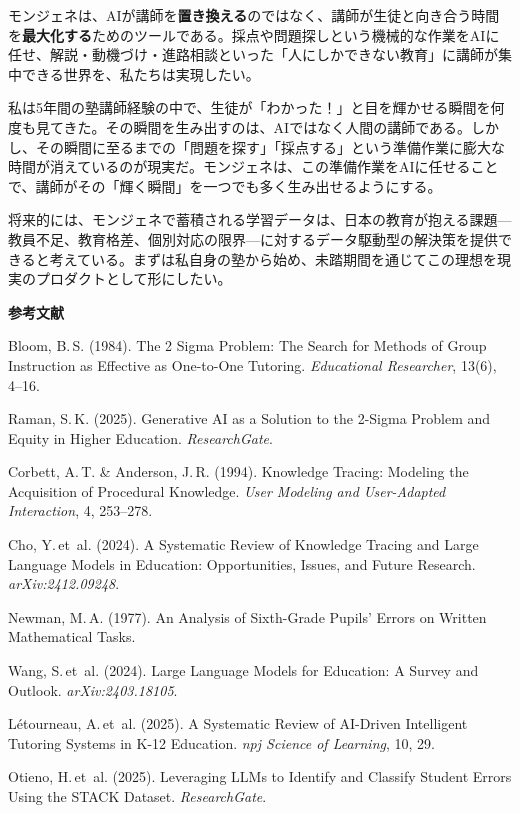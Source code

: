 \documentclass[paper=a4,fontsize=10.5bp,jafontsize=10.5bp,twocolumn]{jlreq}
\begin{document}
モンジェネは、AIが講師を\textbf{置き換える}のではなく、講師が生徒と向き合う時間を\textbf{最大化する}ためのツールである。採点や問題探しという機械的な作業をAIに任せ、解説・動機づけ・進路相談といった「人にしかできない教育」に講師が集中できる世界を、私たちは実現したい。

私は5年間の塾講師経験の中で、生徒が「わかった！」と目を輝かせる瞬間を何度も見てきた。その瞬間を生み出すのは、AIではなく人間の講師である。しかし、その瞬間に至るまでの「問題を探す」「採点する」という準備作業に膨大な時間が消えているのが現実だ。モンジェネは、この準備作業をAIに任せることで、講師がその「輝く瞬間」を一つでも多く生み出せるようにする。

将来的には、モンジェネで蓄積される学習データは、日本の教育が抱える課題---教員不足、教育格差、個別対応の限界---に対するデータ駆動型の解決策を提供できると考えている。まずは私自身の塾から始め、未踏期間を通じてこの理想を現実のプロダクトとして形にしたい。

\vspace{1.5em}
\noindent\textbf{参考文献}
\begin{enumerate}[leftmargin=2em,label={[\arabic*]}]
  \item Bloom, B.\,S. (1984). The 2 Sigma Problem: The Search for Methods of Group Instruction as Effective as One-to-One Tutoring. \textit{Educational Researcher}, 13(6), 4--16.
  \item Raman, S.\,K. (2025). Generative AI as a Solution to the 2-Sigma Problem and Equity in Higher Education. \textit{ResearchGate}.
  \item Corbett, A.\,T. \& Anderson, J.\,R. (1994). Knowledge Tracing: Modeling the Acquisition of Procedural Knowledge. \textit{User Modeling and User-Adapted Interaction}, 4, 253--278.
  \item Cho, Y.\,et~al. (2024). A Systematic Review of Knowledge Tracing and Large Language Models in Education: Opportunities, Issues, and Future Research. \textit{arXiv:2412.09248}.
  \item Newman, M.\,A. (1977). An Analysis of Sixth-Grade Pupils' Errors on Written Mathematical Tasks.
  \item Wang, S.\,et~al. (2024). Large Language Models for Education: A Survey and Outlook. \textit{arXiv:2403.18105}.
  \item L\'{e}tourneau, A.\,et~al. (2025). A Systematic Review of AI-Driven Intelligent Tutoring Systems in K-12 Education. \textit{npj Science of Learning}, 10, 29.
  \item Otieno, H.\,et~al. (2025). Leveraging LLMs to Identify and Classify Student Errors Using the STACK Dataset. \textit{ResearchGate}.
\end{enumerate}
\end{document}
